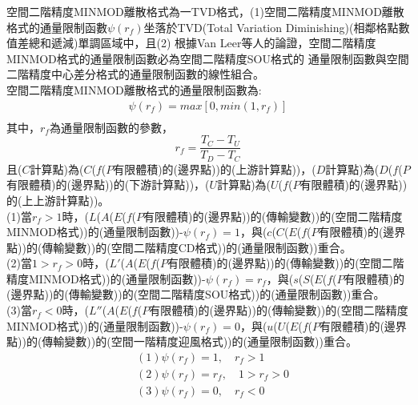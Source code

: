 \documentclass[12pt]{article}
\begin{document}
空間二階精度MINMOD離散格式為一TVD格式，(1)空間二階精度MINMOD離散格式的通量限制函數$\psi(r_{f})$坐落於TVD(Total Variation Diminishing)(相鄰格點數值差總和遞減)單調區域中，且(2)
根據Van Leer等人的論證，空間二階精度MINMOD格式的通量限制函數必為空間二階精度SOU格式的
通量限制函數與空間二階精度中心差分格式的通量限制函數的線性組合。\\
\noindent 空間二階精度MINMOD離散格式的通量限制函數為:\\
\begin{equation}
    \begin{split}
        \psi(r_{f}) = max[0,min(1,r_{f})]\\
    \end{split}
\end{equation}
\noindent 其中，$r_{f}$為通量限制函數的參數，$$r_{f} = \frac{T_{C}-T_{U}}{T_{D}-T_{C}}$$且($C$計算點)為($C$($f$($P$有限體積)的(邊界點))的(上游計算點))，($D$計算點)為($D$($f$($P$有限體積)的(邊界點))的(下游計算點))，($U$計算點)為($U$($f$($P$有限體積)的(邊界點))的(上上游計算點))。\\

\noindent (1)當$r_{f} > 1$時，($L$($A$($E$($f$($P$有限體積)的(邊界點))的(傳輸變數))的(空間二階精度MINMOD格式))的(通量限制函數))-$\psi(r_{f}) = 1$，與($c$($C$($E$($f$($P$有限體積)的(邊界點))的(傳輸變數))的(空間二階精度CD格式))的(通量限制函數))重合。\\
\noindent (2)當$1>r_{f}>0$時，($L'$($A$($E$($f$($P$有限體積)的(邊界點))的(傳輸變數))的(空間二階精度MINMOD格式))的(通量限制函數))-$\psi(r_{f}) = r_{f}$，與($s$($S$($E$($f$($P$有限體積)的(邊界點))的(傳輸變數))的(空間二階精度SOU格式))的(通量限制函數))重合。\\
\noindent (3)當$r_{f} < 0$時，($L''$($A$($E$($f$($P$有限體積)的(邊界點))的(傳輸變數))的(空間二階精度MINMOD格式))的(通量限制函數))-$\psi(r_{f}) = 0$，與($u$($U$($E$($f$($P$有限體積)的(邊界點))的(傳輸變數))的(空間一階精度迎風格式))的(通量限制函數))重合。\\
\begin{equation}
\begin{split}
  &(1) \psi(r_{f}) = 1 ,\quad r_{f} > 1 \\
  &(2) \psi(r_{f}) = r_{f} ,\quad 1 > r_{f} > 0 \\
  &(3) \psi(r_{f}) = 0 ,\quad  r_{f} < 0
\end{split}
\end{equation}
\end{document}
